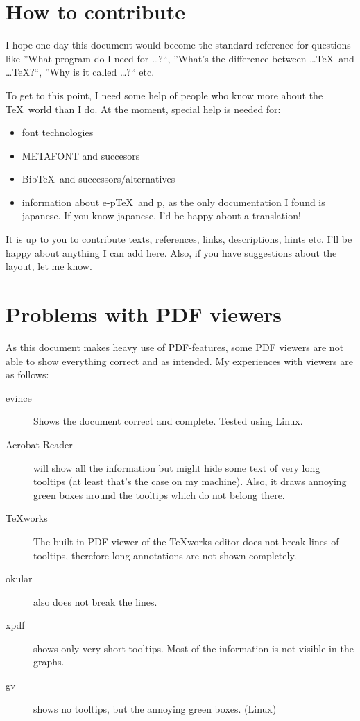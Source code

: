 \section{How to contribute}
I hope one day this document would become the standard reference for questions like ”What program do I need for …?“, ”What's the difference between …\TeX\ and …\TeX?“, ”Why is it called …?“ etc.

To get to this point, I need some help of people who know more about the \TeX\ world than I do. At the moment, special help is needed for:
\begin{itemize}
\item font technologies
\item METAFONT and succesors
\item Bib\TeX\ and successors/alternatives
\item information about e-p\TeX\ and p\BibTeX, as the only documentation I found is japanese. If you know japanese, I'd be happy about a translation!
\end{itemize}

It is up to you to contribute texts, references, links, descriptions, hints etc. I'll be happy about anything I can add here. Also, if you have suggestions about the layout, let me know.

\section{Problems with PDF viewers}
As this document makes heavy use of PDF-features, some PDF viewers are not able to show everything correct and as intended. My experiences with viewers are as follows:

\begin{description}
\item[evince] Shows the document correct and complete. Tested using Linux.

\item[Acrobat Reader] will show all the information but might hide some text of very long tooltips (at least that's the case on my machine). Also, it draws annoying green boxes around the tooltips which do not belong there.

\item[TeXworks] The built-in PDF viewer of the TeXworks editor does not break lines of tooltips, therefore long annotations are not shown completely.

\item[okular] also does not break the lines.

\item[xpdf] shows only very short tooltips. Most of the information is not visible in the graphs.

\item[gv] shows no tooltips, but the annoying green boxes. (Linux)
\end{description}

